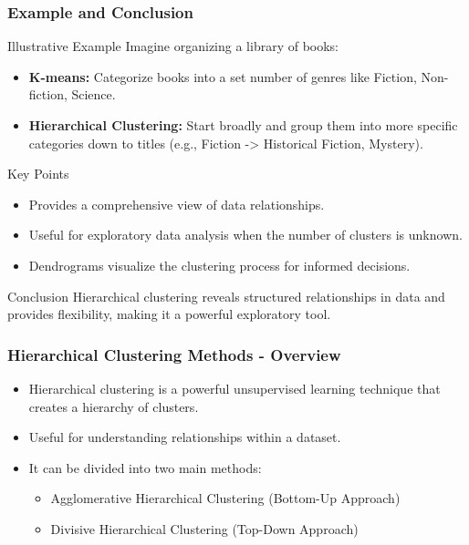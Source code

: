 \documentclass[aspectratio=169]{beamer}
\begin{document}
\begin{frame}[fragile]
    \frametitle{Example and Conclusion}
    \begin{block}{Illustrative Example}
        Imagine organizing a library of books:
        \begin{itemize}
            \item \textbf{K-means:} Categorize books into a set number of genres like Fiction, Non-fiction, Science.
            \item \textbf{Hierarchical Clustering:} Start broadly and group them into more specific categories down to titles (e.g., Fiction -> Historical Fiction, Mystery).
        \end{itemize}
    \end{block}

    \begin{block}{Key Points}
        \begin{itemize}
            \item Provides a comprehensive view of data relationships.
            \item Useful for exploratory data analysis when the number of clusters is unknown.
            \item Dendrograms visualize the clustering process for informed decisions.
        \end{itemize}
    \end{block}

    \begin{block}{Conclusion}
        Hierarchical clustering reveals structured relationships in data and provides flexibility, making it a powerful exploratory tool.
    \end{block}
\end{frame}

\begin{frame}[fragile]
    \frametitle{Hierarchical Clustering Methods - Overview}
    \begin{itemize}
        \item Hierarchical clustering is a powerful unsupervised learning technique that creates a hierarchy of clusters.
        \item Useful for understanding relationships within a dataset.
        \item It can be divided into two main methods:
        \begin{itemize}
            \item Agglomerative Hierarchical Clustering (Bottom-Up Approach)
            \item Divisive Hierarchical Clustering (Top-Down Approach)
        \end{itemize}
    \end{itemize}
\end{frame}
\end{document}
